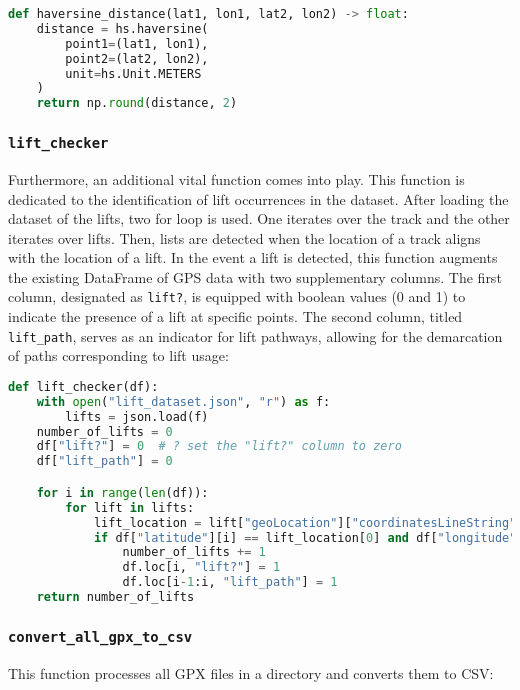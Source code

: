 \begin{lstlisting}[language=Python]
def haversine_distance(lat1, lon1, lat2, lon2) -> float:
    distance = hs.haversine(
        point1=(lat1, lon1),
        point2=(lat2, lon2),
        unit=hs.Unit.METERS
    )
    return np.round(distance, 2)
\end{lstlisting}

\subsubsection{\texttt{lift\_checker}}

Furthermore, an additional vital function comes into play. This function is dedicated to the identification of 
lift occurrences in the dataset. After loading the dataset of the lifts, two for loop is used. 
One iterates over the track and the other iterates over lifts. Then, lists are detected when the location of a track aligns with the location of a lift.
In the event a lift is detected, this function augments the existing DataFrame of 
GPS data with two supplementary columns. The first column, designated as \texttt{lift?}, 
is equipped with boolean values (0 and 1) to indicate the presence of a lift at specific points. 
The second column, titled \texttt{lift\_path}, serves as an indicator for lift pathways, 
allowing for the demarcation of paths corresponding to lift usage:

\begin{lstlisting}[language=Python]
def lift_checker(df):
    with open("lift_dataset.json", "r") as f:
        lifts = json.load(f)
    number_of_lifts = 0
    df["lift?"] = 0  # ? set the "lift?" column to zero
    df["lift_path"] = 0

    for i in range(len(df)):
        for lift in lifts:
            lift_location = lift["geoLocation"]["coordinatesLineString"]
            if df["latitude"][i] == lift_location[0] and df["longitude"][i] == lift_location[1]:
                number_of_lifts += 1
                df.loc[i, "lift?"] = 1
                df.loc[i-1:i, "lift_path"] = 1
    return number_of_lifts
\end{lstlisting}

\subsubsection{\texttt{convert\_all\_gpx\_to\_csv}}

This function processes all GPX files in a directory and converts them to CSV:

